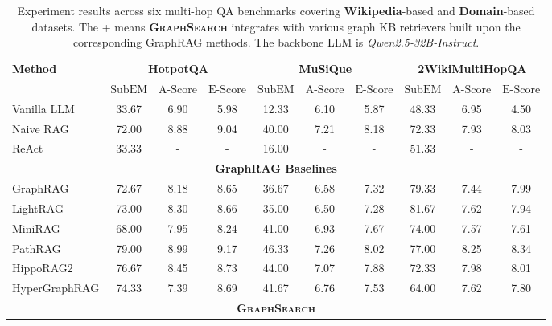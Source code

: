 \begin{table}[t]
\caption{Experiment results across six multi-hop QA benchmarks covering \textbf{Wikipedia}-based and \textbf{Domain}-based datasets. The + means \textbf{\textsc{GraphSearch}} integrates with various graph KB retrievers built upon the corresponding GraphRAG methods. The backbone LLM is \textit{Qwen2.5-32B-Instruct}.}
\label{Tab:main_exp}
\setlength{\tabcolsep}{4pt}
\begin{center}
\begin{tabular}{lccccccccc}
\toprule
\multirow{2}{*}{\normalsize\textbf{Method}}
& \multicolumn{3}{c}{\textbf{HotpotQA}}
& \multicolumn{3}{c}{\textbf{MuSiQue}}
& \multicolumn{3}{c}{\textbf{2WikiMultiHopQA}} \\
\cmidrule[1pt](lr){2-4} \cmidrule[1pt](lr){5-7} \cmidrule[1pt](lr){8-10}
& {\scriptsize $\mathrm{SubEM}$} & {\scriptsize $\mathrm{A\text{-}Score}$} & {\scriptsize $\mathrm{E\text{-}Score}$}
& {\scriptsize $\mathrm{SubEM}$} & {\scriptsize $\mathrm{A\text{-}Score}$} & {\scriptsize $\mathrm{E\text{-}Score}$}
& {\scriptsize $\mathrm{SubEM}$} & {\scriptsize $\mathrm{A\text{-}Score}$} & {\scriptsize $\mathrm{E\text{-}Score}$} \\
\midrule
Vanilla LLM      & 33.67 & 6.90 & 5.98 & 12.33 & 6.10 & 5.87 & 48.33 & 6.95 & 4.50 \\
Naive RAG        & 72.00 & 8.88 & 9.04 & 40.00 & 7.21 & 8.18 & 72.33 & 7.93 & 8.03 \\
ReAct            & 33.33 & -    & -    & 16.00 & -    & -    & 51.33  & -    & -    \\
\midrule
\multicolumn{10}{c}{\textbf{GraphRAG Baselines}} \\
\midrule
GraphRAG         & 72.67 & 8.18 & 8.65 & 36.67 & 6.58 & 7.32 & 79.33 & 7.44 & 7.99 \\
LightRAG         & 73.00 & 8.30 & 8.66 & 35.00 & 6.50 & 7.28 & 81.67 & 7.62 & 7.94 \\
MiniRAG          & 68.00 & 7.95 & 8.24 & 41.00 & 6.93 & 7.67 & 74.00 & 7.57 & 7.61 \\
PathRAG          & 79.00 & 8.99 & 9.17 & 46.33 & 7.26 & 8.02 & 77.00 & 8.25 & 8.34 \\
HippoRAG2        & 76.67 & 8.45 & 8.73 & 44.00 & 7.07 & 7.88 & 72.33 & 7.98 & 8.01 \\
HyperGraphRAG    & 74.33 & 7.39 & 8.69 & 41.67 & 6.76 & 7.53 & 64.00 & 7.62 & 7.80 \\
\midrule
\multicolumn{10}{c}{\textbf{\textsc{GraphSearch}}} \\

\end{tabular}
\end{center}
\end{table}
